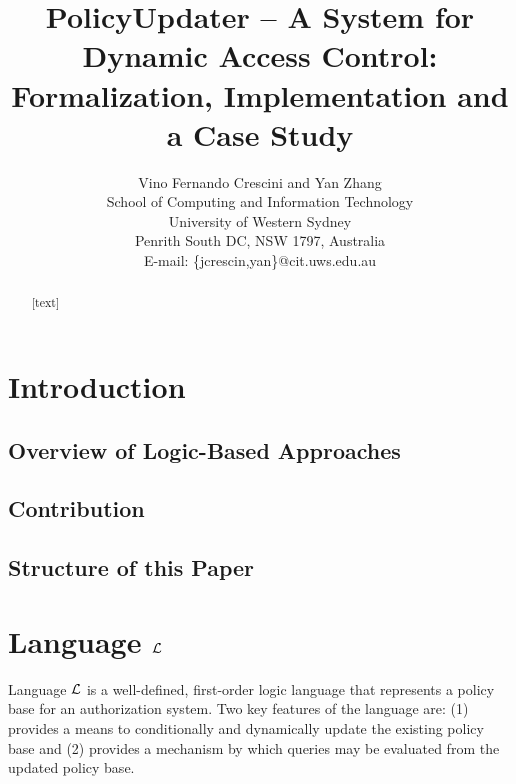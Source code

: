 \documentclass[10pt, twocolumn]{article}
\begin{document}
  \title{
    PolicyUpdater -- A System for Dynamic Access Control:  \\
    Formalization, Implementation and a Case Study
  }

  \author{
    Vino Fernando Crescini and Yan Zhang                   \\
    School of Computing and Information Technology         \\
    University of Western Sydney                           \\
    Penrith South DC, NSW 1797, Australia                  \\
    E-mail: \{jcrescin,yan\}@cit.uws.edu.au
  }

  \date{}

  \maketitle

  \begin{abstract}
    [text]
  \end{abstract}

  \section{Introduction}

    \subsection{Overview of Logic-Based Approaches}

    \subsection{Contribution}

    \subsection{Structure of this Paper}

  \section{Language $\cal{L}$}

    Language $\cal{L}$ is a well-defined, first-order logic language that
    represents a policy base for an authorization system. Two key features of
    the language are: (1) provides a means to conditionally and dynamically
    update the existing policy base and (2) provides a mechanism by which
    queries may be evaluated from the updated policy base.
\end{document}
